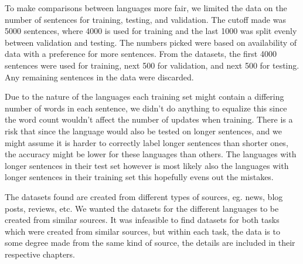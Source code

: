 To make comparisons between languages more fair, we limited the data on the
number of sentences for training, testing, and validation. The cutoff made was
5000 sentences, where 4000 is used for training and the last 1000 was split
evenly between validation and testing. The numbers picked were based on
availability of data with a preference for more sentences. From the datasets,
the first 4000 sentences were used for training, next 500 for validation, and
next 500 for testing. Any remaining sentences in the data were discarded.

Due to the nature of the languages each training set might contain a differing
number of words in each sentence, we didn't do anything to equalize this since
the word count wouldn't affect the number of updates when training. There is a
risk that since the language would also be tested on longer sentences, and we
might assume it is harder to correctly label longer sentences than shorter ones,
the accuracy might be lower for these languages than others. The languages with
longer sentences in their test set however is most likely also the languages
with longer sentences in their training set this hopefully evens out the
mistakes.

The datasets found are created from different types of sources, eg. news, blog
posts, reviews, etc. We wanted the datasets for the different languages to be
created from similar sources. It was infeasible to find datasets for both tasks
which were created from similar sources, but within each task, the data is to
some degree made from the same kind of source, the details are included in their
respective chapters.


\pagebreak